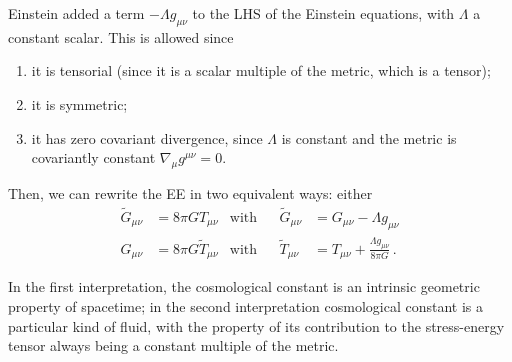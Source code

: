 \documentclass[main.tex]{subfiles}
\begin{document}

Einstein added a term \(- \Lambda g_{\mu \nu }\) to the LHS of the Einstein equations, with \(\Lambda \) a constant scalar. This is allowed since 

\begin{enumerate}
  \item it is tensorial (since it is a scalar multiple of the metric, which is a tensor);
  \item it is symmetric;
  \item it has zero covariant divergence, since \(\Lambda \) is constant and the metric is covariantly constant \(\nabla_{\mu } g^{\mu \nu } = 0\).
\end{enumerate}

Then, we can rewrite the EE in two equivalent ways: either 
%
\begin{align}
\widetilde{G}_{\mu \nu } &= 8 \pi G T_{\mu \nu } &\text{with}&& \widetilde{G}_{\mu \nu } &= G_{\mu \nu } - \Lambda g_{\mu \nu }  \\
G_{\mu \nu } &= 8\pi G \widetilde{T}_{\mu \nu } &\text{with}&& 
\widetilde{T}_{\mu \nu } &= T_{\mu \nu } + \frac{\Lambda g_{\mu \nu }}{8 \pi G} 
\,.
\end{align}
%

In the first interpretation, the cosmological constant is an intrinsic geometric property of spacetime; in the second interpretation cosmological constant is a particular kind of fluid, with the property of its contribution to the stress-energy tensor always being a constant multiple of the metric. 
\end{document}
